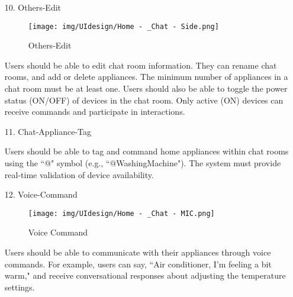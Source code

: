 \documentclass[conference]{IEEEtran}
\begin{document}
\begin{enumerate}
    \item[10.] Others-Edit
    \begin{figure}[h]
\hspace{1.5cm}
\centering
\begin{minipage}{0.4\columnwidth}
    \texttt{[image: img/UIdesign/Home - \_Chat - Side.png]}
    \caption{Others-Edit}
\end{minipage}
\end{figure}
    
    Users should be able to edit chat room information. They can rename chat rooms, and add or delete appliances. The minimum number of appliances in a chat room must be at least one. Users should also be able to toggle the power status (ON/OFF) of devices in the chat room. Only active (ON) devices can receive commands and participate in interactions. \\
\end{enumerate}

\begin{enumerate}
    \item[11.] Chat-Appliance-Tag
    
    Users should be able to tag and command home appliances within chat rooms using the ``@" symbol (e.g., ``@WashingMachine"). The system must provide real-time validation of device availability. \\
\end{enumerate}

\begin{enumerate}
    \item[12.] Voice-Command
    \begin{figure}[h]
\hspace{1.5cm}
\centering
\begin{minipage}{0.4\columnwidth}
    \texttt{[image: img/UIdesign/Home - \_Chat - MIC.png]}
    \caption{Voice Command}
\end{minipage}
\end{figure}
    
    Users should be able to communicate with their appliances through voice commands. For example, users can say, ``Air conditioner, I'm feeling a bit warm," and receive conversational responses about adjusting the temperature settings. \\ \\ \\ \\
\end{enumerate}
\end{document}
